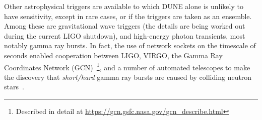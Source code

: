 
Other astrophysical triggers are available to which DUNE alone is unlikely to have sensitivity, except in rare cases, or if the triggers are taken as an ensemble. 
 Among these are gravitational wave triggers %
 (the details are being worked
out during the current LIGO shutdown), and high-energy photon
transients, most notably gamma ray bursts.
In fact, the use of network sockets on the timescale of seconds
enabled cooperation between LIGO, VIRGO, the Gamma Ray Coordinates
Network (GCN)~\footnote{Described in detail at
  \url{https://gcn.gsfc.nasa.gov/gcn_describe.html}}, and a number of
automated telescopes to make the discovery that \textit{short/hard} gamma ray bursts are caused by colliding neutron stars~\cite{kilonova}.
